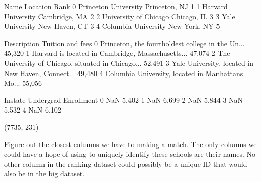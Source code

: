 \documentclass[letterpaper,10pt,english]{sphinxmanual}
\begin{document}
\begin{sphinxVerbatim}[commandchars=\\\{\}]
     
\end{sphinxVerbatim}

\begin{sphinxVerbatim}[commandchars=\\\{\}]
                    Name       Location  Rank  \PYGZbs{}
0   Princeton University  Princeton, NJ     1   
1     Harvard University  Cambridge, MA     2   
2  University of Chicago    Chicago, IL     3   
3        Yale University  New Haven, CT     3   
4    Columbia University   New York, NY     5   

                                         Description Tuition and fees  \PYGZbs{}
0  Princeton, the fourth\PYGZhy{}oldest college in the Un...         \PYGZdl{}45,320    
1  Harvard is located in Cambridge, Massachusetts...         \PYGZdl{}47,074    
2  The University of Chicago, situated in Chicago...         \PYGZdl{}52,491    
3  Yale University, located in New Haven, Connect...         \PYGZdl{}49,480    
4  Columbia University, located in Manhattan\PYGZsq{}s Mo...         \PYGZdl{}55,056    

  In\PYGZhy{}state Undergrad Enrollment  
0      NaN                5,402  
1      NaN                6,699  
2      NaN                5,844  
3      NaN                5,532  
4      NaN                6,102  
\end{sphinxVerbatim}

\begin{sphinxVerbatim}[commandchars=\\\{\}]
     
\end{sphinxVerbatim}

\begin{sphinxVerbatim}[commandchars=\\\{\}]
(7735, 231)
\end{sphinxVerbatim}

 Figure out the closest columns we have to making a match.  The only columns we could have a hope of using to uniquely identify these schools are their names.  No other column in the ranking dataset could possibly be a unique ID that would also be in the big dataset.
\end{document}

